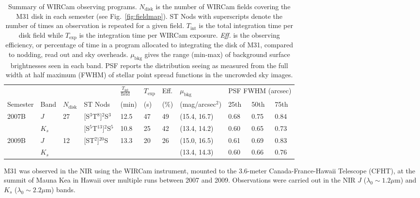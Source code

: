 \documentclass[iop,tighten]{emulateapj}
\newcommand{\Fig}[1]{Fig.~\ref{fig:#1}}  %
\begin{document}
\begin{table*}[t]
\caption[Summary of WIRCam observing programs]{Summary of WIRCam observing programs.
$N_\mathrm{disk}$ is the number of WIRCam fields covering the M31 disk in each semester (see \Fig{fieldmap}).
ST Nods with superscripts denote the number of times an observation is repeated for a given field.
$T_\mathrm{int}$ is the total integration time per disk field while $T_\mathrm{exp}$ is the integration time per WIRCam exposure.
\emph{Eff.} is the observing efficiency, or percentage of time in a program allocated to integrating the disk of M31, compared to nodding, read out and sky overheads.
$\mu_\mathrm{bkg}$ gives the range (min-max) of background surface brightnesses seen in each band.
PSF reports the distribution seeing as measured from the full width at half maximum (FWHM) of stellar point spread functions in the uncrowded sky images.}
\label{tab:obssummary}
    
    \centering
    \begin{tabular}{lllllllllll}
        & & & & $\frac{T_\mathrm{int}}{\mathrm{field}}$ & $T_\mathrm{exp}$ & Eff. & $\mu_\mathrm{bkg}$ & \multicolumn{3}{c}{PSF FWHM (arcsec)} \\ \cline{9-11}
    Semester & Band & $N_\mathrm{disk}$ & ST Nods & (min) &  (s) &  (\%) & (mag/arcsec$^2$) & 25th  & 50th & 75th \\
    \hline
    \multirow{2}{*}{2007B} & $J$ & \multirow{2}{*}{27} & [S$^3$T$^8$]$^{2}$S$^3$ & 12.5 & 47 & 49 & (15.4, 16.7) & 0.68 & 0.75 & 0.84 \\
     & $K_s$ &  & [S$^5$T$^{13}$]${^2}$S$^5$ & 10.8 & 25 & 42 & (13.4, 14.2) & 0.60 &  0.65 & 0.73 \\
     \hline
     \multirow{2}{*}{2009B} & $J$ & \multirow{2}{*}{12} & \multirow{2}{*}{[ST$^2$]$^{20}$S} & \multirow{2}{*}{13.3} & \multirow{2}{*}{20} & \multirow{2}{*}{26} & (15.0, 16.5) & 0.61 & 0.69 & 0.83 \\
                            & $K_s$ & & & & & & (13.4, 14.3) & 0.60 & 0.66 & 0.76 \\
    \end{tabular}
\end{table*}

M31 was observed in the NIR using the WIRCam instrument, mounted to the 3.6-meter Canada-France-Hawaii Telescope (CFHT), at the summit of Mauna Kea in Hawaii over multiple runs between 2007 and 2009.
Observations were carried out in the NIR $J$ ($\lambda_0 \sim 1.2 \mu\mathrm{m}$) and $K_s$ ($\lambda_0 \sim 2.2 \mu\mathrm{m}$) bands.
\end{document}
